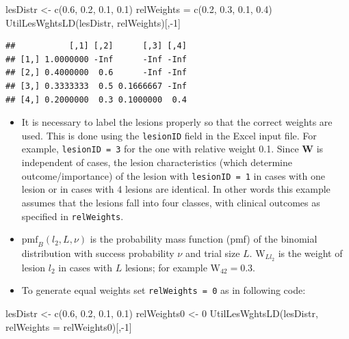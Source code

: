 \documentclass[
]{book}
\newenvironment{Shaded}{\begin{snugshade}}{\end{snugshade}}
\newcommand{\AttributeTok}[1]{\textcolor[rgb]{0.77,0.63,0.00}{#1}}
\newcommand{\DecValTok}[1]{\textcolor[rgb]{0.00,0.00,0.81}{#1}}
\newcommand{\FloatTok}[1]{\textcolor[rgb]{0.00,0.00,0.81}{#1}}
\newcommand{\FunctionTok}[1]{\textcolor[rgb]{0.00,0.00,0.00}{#1}}
\newcommand{\NormalTok}[1]{#1}
\newcommand{\OtherTok}[1]{\textcolor[rgb]{0.56,0.35,0.01}{#1}}
\newcommand{\SpecialCharTok}[1]{\textcolor[rgb]{0.00,0.00,0.00}{#1}}
\providecommand{\tightlist}{%
  \setlength{\itemsep}{0pt}\setlength{\parskip}{0pt}}
\begin{document}
\begin{Shaded}
\begin{Highlighting}[]
\NormalTok{lesDistr }\OtherTok{\textless{}{-}} \FunctionTok{c}\NormalTok{(}\FloatTok{0.6}\NormalTok{, }\FloatTok{0.2}\NormalTok{, }\FloatTok{0.1}\NormalTok{, }\FloatTok{0.1}\NormalTok{)}
\NormalTok{relWeights }\OtherTok{=}  \FunctionTok{c}\NormalTok{(}\FloatTok{0.2}\NormalTok{, }\FloatTok{0.3}\NormalTok{, }\FloatTok{0.1}\NormalTok{, }\FloatTok{0.4}\NormalTok{)}
\FunctionTok{UtilLesWghtsLD}\NormalTok{(lesDistr, relWeights)[,}\SpecialCharTok{{-}}\DecValTok{1}\NormalTok{]}
\end{Highlighting}
\end{Shaded}

\begin{verbatim}
##           [,1] [,2]      [,3] [,4]
## [1,] 1.0000000 -Inf      -Inf -Inf
## [2,] 0.4000000  0.6      -Inf -Inf
## [3,] 0.3333333  0.5 0.1666667 -Inf
## [4,] 0.2000000  0.3 0.1000000  0.4
\end{verbatim}

\begin{itemize}
\tightlist
\item
  It is necessary to label the lesions properly so that the correct weights are used. This is done using the \texttt{lesionID} field in the Excel input file. For example, \texttt{lesionID\ =\ 3} for the one with relative weight 0.1. Since \(\mathbf{W}\) is independent of cases, the lesion characteristics (which determine outcome/importance) of the lesion with \texttt{lesionID\ =\ 1} in cases with one lesion or in cases with 4 lesions are identical. In other words this example assumes that the lesions fall into four classes, with clinical outcomes as specified in \texttt{relWeights}.
\item
  \(\text{pmf}_{B}\left ( l_2, L, \nu \right )\) is the probability mass function (pmf) of the binomial distribution with success probability \(\nu\) and trial size \(L\). \(\text{W}_{Ll_2}\) is the weight of lesion \(l_2\) in cases with \(L\) lesions; for example \(\text{W}_{42} = 0.3\).
\item
  To generate equal weights set \texttt{relWeights\ =\ 0} as in following code:
\end{itemize}

\begin{Shaded}
\begin{Highlighting}[]
\NormalTok{lesDistr }\OtherTok{\textless{}{-}} \FunctionTok{c}\NormalTok{(}\FloatTok{0.6}\NormalTok{, }\FloatTok{0.2}\NormalTok{, }\FloatTok{0.1}\NormalTok{, }\FloatTok{0.1}\NormalTok{)}
\NormalTok{relWeights0 }\OtherTok{\textless{}{-}} \DecValTok{0}
\FunctionTok{UtilLesWghtsLD}\NormalTok{(lesDistr, }\AttributeTok{relWeights =}\NormalTok{ relWeights0)[,}\SpecialCharTok{{-}}\DecValTok{1}\NormalTok{]}
\end{Highlighting}
\end{Shaded}
\end{document}
